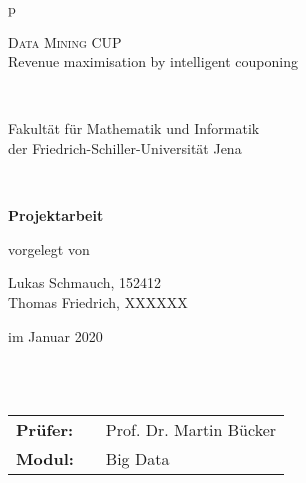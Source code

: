 \begin{center}
\begin{tabular}{p{\textwidth}}






\begin{center}
\LARGE{\textsc{
Data Mining CUP
}} \\
Revenue maximisation by intelligent couponing
\end{center}

\\


\begin{center}
\large{Fakultät für Mathematik und Informatik\\
der Friedrich-Schiller-Universität Jena \\}
\end{center}

\\

\begin{center}
\textbf{\Large{Projektarbeit}}
\end{center}




\begin{center}
vorgelegt von
\end{center}

\begin{center}
Lukas Schmauch, 152412 \\
Thomas Friedrich, XXXXXX \\
\end{center}

\begin{center}
\large{im Januar 2020}
\end{center}

\\

\\



\begin{center}
\begin{tabular}{lll}
\textbf{Prüfer:} & & Prof. Dr. Martin Bücker\\
\textbf{Modul:} & & Big Data\\
\end{tabular}
\end{center}

\end{tabular}
\end{center}